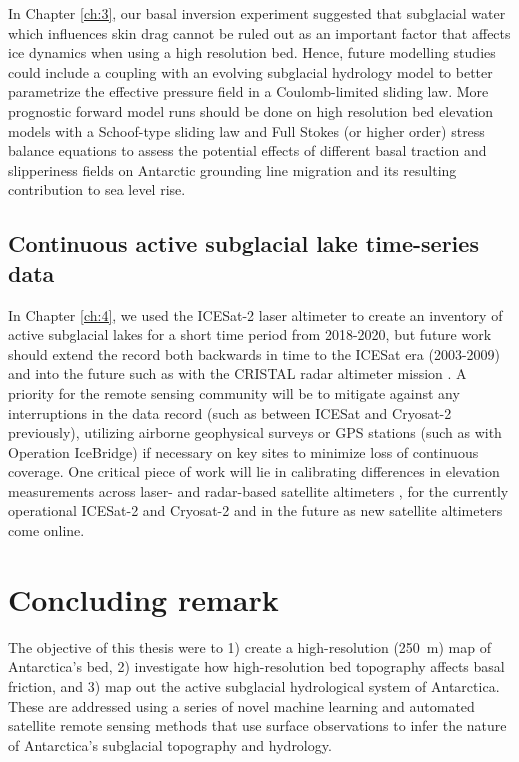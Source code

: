 In Chapter \ref{ch:3}, our basal inversion experiment suggested that subglacial water which influences skin drag cannot be ruled out as an important factor that affects ice dynamics when using a high resolution bed.
Hence, future modelling studies could include a coupling with an evolving subglacial hydrology model \citep[e.g.][]{SommersSHAKTISubglacialHydrology2018} to better parametrize the effective pressure field in a Coulomb-limited sliding law.
More prognostic forward model runs should be done on high resolution bed elevation models with a Schoof-type sliding law and Full Stokes (or higher order) stress balance equations to assess the potential effects of different basal traction and slipperiness fields on Antarctic grounding line migration and its resulting contribution to sea level rise.

\subsection{Continuous active subglacial lake time-series data}

In Chapter \ref{ch:4}, we used the ICESat-2 laser altimeter to create an inventory of active subglacial lakes for a short time period from 2018-2020, but future work should extend the record both backwards in time to the ICESat era (2003-2009) and into the future such as with the CRISTAL radar altimeter mission \citep{KernCopernicusPolarIce2020}.
A priority for the remote sensing community will be to mitigate against any interruptions in the data record (such as between ICESat and Cryosat-2 previously), utilizing airborne geophysical surveys or GPS stations (such as with Operation IceBridge) if necessary on key sites to minimize loss of continuous coverage.
One critical piece of work will lie in calibrating differences in elevation measurements across laser- and radar-based satellite altimeters \citep[c.f.][]{SiegfriedThirteenyearssubglacial2018}, for the currently operational ICESat-2 and Cryosat-2 \citep{BruntComparisonsSatelliteAirborne2020} and in the future as new satellite altimeters come online.

\section{Concluding remark}

The objective of this thesis were to 1) create a high-resolution (\SI{250}{\metre}) map of Antarctica's bed, 2) investigate how high-resolution bed topography affects basal friction, and 3) map out the active subglacial hydrological system of Antarctica.
These are addressed using a series of novel machine learning and automated satellite remote sensing methods that use surface observations to infer the nature of Antarctica's subglacial topography and hydrology.

